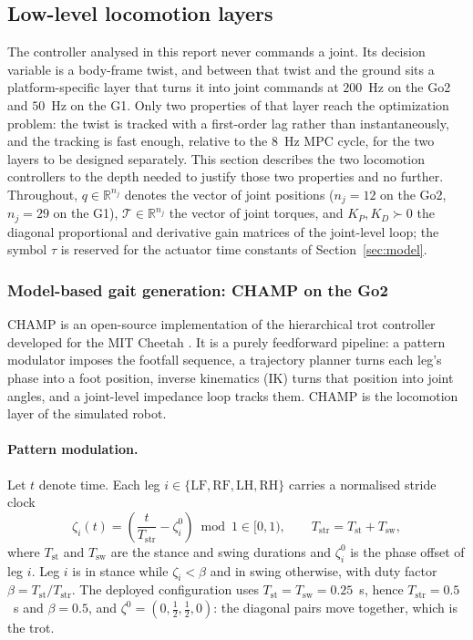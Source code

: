 \documentclass[11pt,a4paper]{article}
\newcommand{\R}{\mathbb{R}}
\newcommand{\Tstr}{T_{\mathrm{str}}}
\newcommand{\Tst}{T_{\mathrm{st}}}
\newcommand{\Tsw}{T_{\mathrm{sw}}}
\begin{document}
\subsection{Low-level locomotion layers}
\label{sec:lowlevel}

The controller analysed in this report never commands a joint. Its decision variable is a body-frame twist,
and between that twist and the ground sits a platform-specific layer that turns it into joint commands at
$200$~Hz on the Go2 and $50$~Hz on the G1. Only two properties of that layer reach the optimization problem:
the twist is tracked with a first-order lag rather than instantaneously, and the tracking is fast enough,
relative to the $8$~Hz MPC cycle, for the two layers to be designed separately. This section describes the
two locomotion controllers to the depth needed to justify those two properties and no further. Throughout, $q\in\R^{n_j}$
denotes the vector of joint positions ($n_j=12$ on the Go2, $n_j=29$ on the G1), $\mathcal{T}\in\R^{n_j}$ the
vector of joint torques, and $K_P,K_D\succ0$ the diagonal proportional and derivative gain matrices of the
joint-level loop; the symbol $\tau$ is reserved for the actuator time constants of
Section~\ref{sec:model}.

\subsubsection{Model-based gait generation: CHAMP on the Go2}
\label{sec:champ}

CHAMP \cite{champ} is an open-source implementation of the hierarchical trot controller developed for the MIT
Cheetah \cite{lee2013hierarchical,hyun2014trot}. It is a purely feedforward pipeline: a pattern modulator
imposes the footfall sequence, a trajectory planner turns each leg's phase into a foot position, inverse
kinematics (IK) turns that position into joint angles, and a joint-level impedance loop tracks them. CHAMP is the locomotion layer of the simulated robot.

\paragraph{Pattern modulation.} Let $t$ denote time. Each leg $i\in\{\mathrm{LF},\mathrm{RF},\mathrm{LH},
\mathrm{RH}\}$ carries a normalised stride clock
\begin{equation}
  \zeta_i(t)=\left(\frac{t}{\Tstr}-\zeta_i^{0}\right)\bmod 1\in[0,1),
  \qquad \Tstr=\Tst+\Tsw ,
  \label{eq:gaitphase}
\end{equation}
where $\Tst$ and $\Tsw$ are the stance and swing durations and $\zeta_i^{0}$ is the phase offset of leg $i$.
Leg $i$ is in stance while $\zeta_i<\beta$ and in swing otherwise, with duty factor $\beta=\Tst/\Tstr$. The
deployed configuration uses $\Tst=\Tsw=0.25$~s, hence $\Tstr=0.5$~s and $\beta=0.5$, and
$\zeta^{0}=(0,\tfrac12,\tfrac12,0)$: the diagonal pairs move together, which is the trot.
\end{document}
